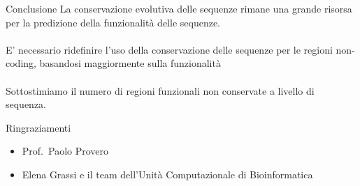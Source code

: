 \documentclass{beamer}
\begin{document}

    \begin{frame}[plain]{Conclusione}
        La conservazione evolutiva delle sequenze rimane una grande risorsa
        per la predizione della funzionalità delle sequenze.
        \\~\\
        E' necessario ridefinire l'uso della conservazione
        delle sequenze per le regioni non-coding, basandosi maggiormente sulla funzionalità
        \\~\\
        Sottostimiamo il numero di regioni funzionali non conservate a livello di sequenza.
    \end{frame}


    \begin{frame}[plain]{Ringraziamenti}
        \begin{itemize}
            \item Prof.\ Paolo Provero
            \item Elena Grassi e il team dell'Unità Computazionale di Bioinformatica
        \end{itemize}
    \end{frame}
\end{document}

